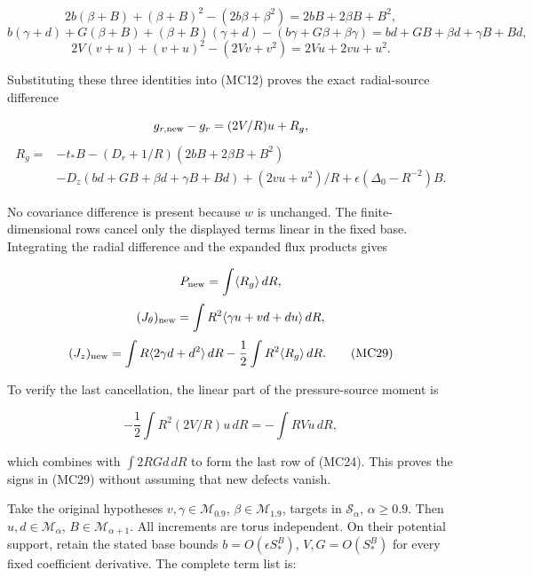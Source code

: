 \documentclass[10pt,a4paper]{article}
\begin{document}
\[
2b(\beta+B)+(\beta+B)^2-(2b\beta+\beta^2)
=2bB+2\beta B+B^2,
\]
\[
b(\gamma+d)+G(\beta+B)+(\beta+B)(\gamma+d)
-(b\gamma+G\beta+\beta\gamma)
=bd+GB+\beta d+\gamma B+Bd,
\]
\[
2V(v+u)+(v+u)^2-(2Vv+v^2)=2Vu+2vu+u^2.
\]

Substituting these three identities into (MC12) proves the exact radial-source difference

\[
g_{r,\rm new}-g_r=(2V/R)u+R_g,
\]
\[
\begin{aligned}
R_g={}&-t_*B-(D_r+1/R)(2bB+2\beta B+B^2)\\
&-D_z(bd+GB+\beta d+\gamma B+Bd)
+(2vu+u^2)/R+\epsilon(\Delta_0-R^{-2})B.
\end{aligned}
\tag{MC28}
\]

No covariance difference is present because \(w\) is unchanged. The finite-dimensional rows cancel only the displayed terms linear in the fixed base. Integrating the radial difference and the expanded flux products gives

\[
P_{\rm new}=\int\langle R_g\rangle\,dR,
\]
\[
(J_\theta)_{\rm new}=\int R^2\langle\gamma u+vd+du\rangle\,dR,
\]
\[
(J_z)_{\rm new}=\int R\langle2\gamma d+d^2\rangle\,dR
-\frac12\int R^2\langle R_g\rangle\,dR.
\tag{MC29}
\]

To verify the last cancellation, the linear part of the pressure-source moment is

\[
-\frac12\int R^2(2V/R)u\,dR=-\int RVu\,dR,
\]

which combines with \(\int2RGd\,dR\) to form the last row of (MC24). This proves the signs in (MC29) without assuming that new defects vanish.

Take the original hypotheses \(v,\gamma\in\mathcal M_{0.9}\), \(\beta\in\mathcal M_{1.9}\), targets in \(\mathcal S_\alpha\), \(\alpha\ge0.9\). Then \(u,d\in\mathcal M_\alpha\), \(B\in\mathcal M_{\alpha+1}\). All increments are torus independent. On their potential support, retain the stated base bounds \(b=O(\epsilon S_*^B)\), \(V,G=O(S_*^B)\) for every fixed coefficient derivative. The complete term list is:
\end{document}
